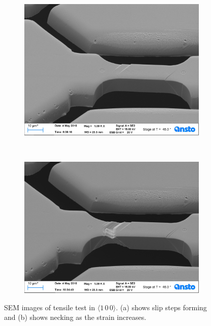 \begin{figure}
    \centering
    \begin{subfigure}[t]{0.45\linewidth}
        \centering
        \includegraphics[width=\linewidth]{../data/Ni016.jpg}
        \caption{}
    \end{subfigure}
    ~
    \begin{subfigure}[t]{0.45\linewidth}
        \centering
        \includegraphics[width=\linewidth]{../data/Ni023.jpg}
        \caption{}
        \label{sf:necking}
    \end{subfigure}
    \caption[SEM images of tensile test in $\langle 1\, 0\, 0 \rangle$.]{SEM images of tensile test in $\langle 1\, 0\, 0 \rangle$. (a) shows slip steps forming and (b) shows necking as the strain increases.}
    \label{f:Ni100_disp}
\end{figure}

